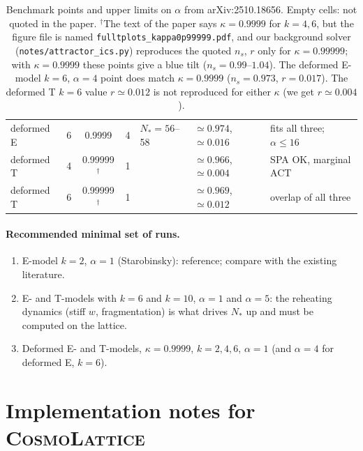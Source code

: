 \documentclass[11pt,a4paper]{article}
\newcommand{\aatt}{\alpha}
\begin{document}
\begin{table}[h!]
{\begin{tabular}{@{}l c c c l l l@{}}
deformed E & 6 & 0.9999 & 4 & $N_*=56$--58 & $\simeq0.974$,\ $\simeq0.016$ & fits all three; $\aatt\le 16$ \\
deformed T & 4 & 0.99999$^\dagger$ & 1 & & $\simeq0.966$,\ $\simeq0.004$ & SPA OK, marginal ACT \\
deformed T & 6 & 0.99999$^\dagger$ & 1 & & $\simeq0.969$,\ $\simeq0.012$ & overlap of all three \\
\bottomrule
\end{tabular}}
\caption{Benchmark points and upper limits on $\aatt$ from arXiv:2510.18656. Empty cells: not quoted in the paper.
$^\dagger$The text of the paper says $\kappa=0.9999$ for $k=4,6$, but the figure file is named \texttt{fulltplots\_kappa0p99999.pdf}, and our background solver (\texttt{notes/attractor\_ics.py}) reproduces the quoted $n_s$, $r$ only for $\kappa=0.99999$; with $\kappa=0.9999$ these points give a blue tilt ($n_s=0.99$--$1.04$). The deformed E-model $k=6$, $\aatt=4$ point does match $\kappa=0.9999$ ($n_s=0.973$, $r=0.017$). The deformed T $k=6$ value $r\simeq0.012$ is not reproduced for either $\kappa$ (we get $r\simeq0.004$).}
\label{tab:bench}
\end{table}

\paragraph{Recommended minimal set of runs.}
\begin{enumerate}
\item E-model $k=2$, $\aatt=1$ (Starobinsky): reference; compare with the existing literature.
\item E- and T-models with $k=6$ and $k=10$, $\aatt=1$ and $\aatt=5$: the reheating dynamics (stiff $w$, fragmentation) is what drives $N_*$ up and must be computed on the lattice.
\item Deformed E- and T-models, $\kappa=0.9999$, $k=2,4,6$, $\aatt=1$ (and $\aatt=4$ for deformed E, $k=6$).
\end{enumerate}

\section{Implementation notes for \textsc{CosmoLattice}}
\label{sec:impl}
\end{document}
